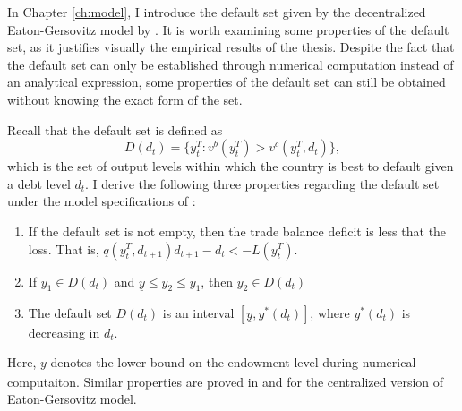 In Chapter \ref{ch:model}, I introduce the default set given by the decentralized Eaton-Gersovitz model by \citet{Na-18}.
It is worth examining some properties of the default set, as it justifies visually the empirical results of the thesis.
Despite the fact that the default set can only be established through numerical computation instead of an analytical expression, some properties of the default set can still be obtained without knowing the exact form of the set.

\newcommand{\yT}{y^T_{t}}
\newcommand{\yTpr}{y^T_{t+1}}
\newcommand{\dpr}{d_{t+1}}
Recall that the default set is defined as
\begin{equation*}
    D(d_t) = \{\yT : v^b(\yT) > v^c(\yT, d_t)\},
\end{equation*}
which is the set of output levels within which the country is best to default given a debt level $d_t$.
I derive the following three properties regarding the default set under the model specifications of \citet{Na-18}:
\begin{enumerate}
    \item If the default set is not empty, then the trade balance deficit  is less that the loss. That is, $q(\yT, \dpr)\dpr - d_t < -L(\yT)$.
    \item If $y_1 \in D(d_t)$ and $\underline{y}\le y_2 \le y_1$, then $y_2 \in D(d_t)$
    \item The default set $D(d_t)$ is an interval $[\underline{y}, y^*(d_t)]$, where $y^*(d_t)$ is decreasing in $d_t$.
\end{enumerate}
Here, $\underline{y}$ denotes the lower bound on the endowment level during numerical computaiton.
Similar properties are proved in \citet*{Arellano-08} and \citet*{Uribe-Schmitt-Grohe-textbook} for the centralized version of Eaton-Gersovitz model.

